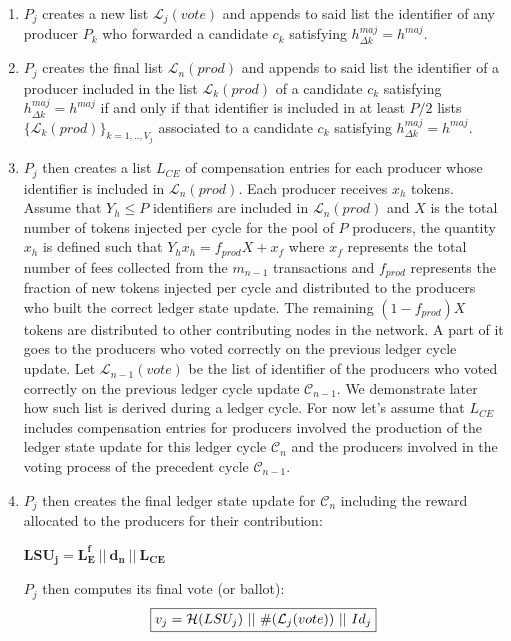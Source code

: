 \begin{enumerate}
\item $P_j$ creates a new list $\mathcal{L}_j(vote)$ and appends to said list the identifier of any producer $P_k$ who forwarded a candidate $c_k$ satisfying $h^{maj}_{\Delta k} = h^{maj}$.
\item $P_j$ creates the final list $\mathcal{L}_n(prod)$ and appends to said list  the identifier of a producer included in the list $\mathcal{L}_k(prod)$ of a candidate $c_k$ satisfying $h^{maj}_{\Delta k} = h^{maj}$ if and only if that identifier is included in at least $P/2$ lists $\{\mathcal{L}_{k}(prod)\}_{k=1,..,V_j}$ associated to a candidate $c_{k}$ satisfying $h^{maj}_{\Delta k} = h^{maj}$. 
\item $P_j$ then creates a list $L_{CE}$ of compensation entries for each producer whose identifier is included in $\mathcal{L}_n(prod)$. Each producer receives $x_h$ tokens. Assume that $Y_h \leq P$ identifiers are included in $\mathcal{L}_n(prod)$ and $X$ is the total number of tokens injected per cycle for the pool of $P$ producers, the quantity $x_h$ is defined such that $Y_hx_h = f_{prod}X + x_f$ where $x_f$ represents the total number of fees collected from the $m_{n-1}$ transactions and $f_{prod}$ represents the fraction of new tokens injected per cycle and distributed to the producers who built the correct ledger state update. The remaining $(1-f_{prod})X$ tokens are distributed to other contributing nodes in the network. A part of it goes to the producers who voted correctly on the previous ledger cycle update. Let $\mathcal{L}_{n-1}(vote)$ be the list of identifier of the producers who voted correctly on the previous ledger cycle update $\mathcal{C}_{n-1}$. We demonstrate later how such list is derived during a ledger cycle. For now let's assume that $L_{CE}$ includes compensation entries for producers involved the production of the ledger state update for this ledger cycle $\mathcal{C}_n$ and the producers involved in the voting process of the precedent cycle $\mathcal{C}_{n-1}$. 
\item $P_j$ then creates the final ledger state update for $\mathcal{C}_n$  including the reward allocated to the producers for their contribution:
\begin{center}
$\mathbf{LSU_j = L^f_E~||~d_n~||~L_{CE}}$
\end{center}
$P_j$ then computes its final vote (or ballot):
\begin{equation}
\label{eq:vj}
\fbox{$v_j = \mathcal{H}(LSU_j)~||~\#(\mathcal{L}_j(vote))~||~Id_j$}
\end{equation}


\end{enumerate}
